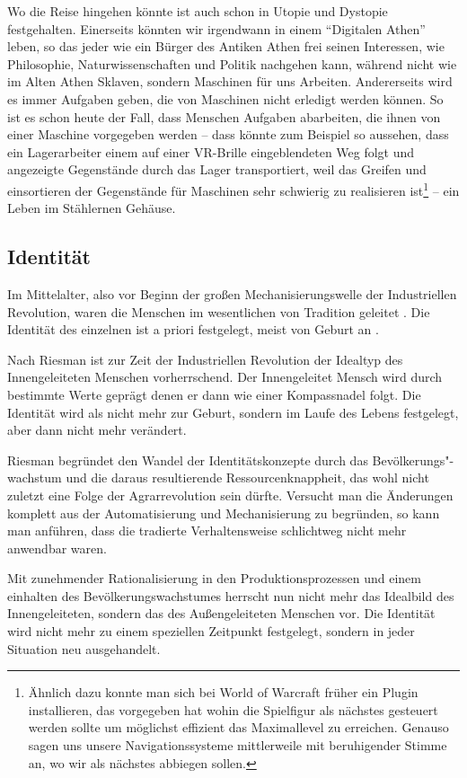 Wo die Reise hingehen könnte ist auch schon in Utopie und Dystopie festgehalten.
Einerseits könnten wir irgendwann in einem \enquote{Digitalen Athen} leben, so das jeder wie ein Bürger des Antiken Athen frei seinen Interessen, wie Philosophie, Naturwissenschaften und Politik nachgehen kann, während nicht wie im Alten Athen Sklaven, sondern Maschinen für uns Arbeiten.
Andererseits wird es immer Aufgaben geben, die von Maschinen nicht erledigt werden können.
So ist es schon heute der Fall, dass Menschen Aufgaben abarbeiten, die ihnen von einer Maschine vorgegeben werden – dass könnte zum Beispiel so aussehen, dass ein Lagerarbeiter einem auf einer VR-Brille eingeblendeten Weg folgt und angezeigte Gegenstände durch das Lager transportiert, weil das Greifen und einsortieren der Gegenstände für Maschinen sehr schwierig zu realisieren ist\footnote{Ähnlich dazu konnte man sich bei World of Warcraft früher ein Plugin installieren, das vorgegeben hat wohin die Spielfigur als nächstes gesteuert werden sollte um möglichst effizient das Maximallevel zu erreichen. Genauso sagen uns unsere Navigationssysteme mittlerweile mit beruhigender Stimme an, wo wir als nächstes abbiegen sollen.} – ein Leben im Stählernen Gehäuse.

\subsection{Identität}

Im Mittelalter, also vor Beginn der großen Mechanisierungswelle der Industriellen Revolution, waren die Menschen im wesentlichen von Tradition geleitet \parencite{riessman}.
Die Identität des einzelnen ist a priori festgelegt, meist von Geburt an \parencite{rosa}.

Nach Riesman ist zur Zeit der Industriellen Revolution der Idealtyp des Innengeleiteten Menschen vorherrschend. Der Innengeleitet Mensch wird durch bestimmte Werte geprägt denen er dann wie einer Kompassnadel folgt.
Die Identität wird als nicht mehr zur Geburt, sondern im Laufe des Lebens festgelegt, aber dann nicht mehr verändert.

Riesman begründet den Wandel der Identitätskonzepte durch das Bevölkerungs"-wachstum und die daraus resultierende Ressourcenknappheit, das wohl nicht zuletzt eine Folge der Agrarrevolution sein dürfte.
Versucht man die Änderungen komplett aus der Automatisierung und Mechanisierung zu begründen, so kann man anführen, dass die tradierte Verhaltensweise schlichtweg nicht mehr anwendbar waren. 

Mit zunehmender Rationalisierung in den Produktionsprozessen und einem einhalten des Bevölkerungswachstumes herrscht nun nicht mehr das Idealbild des Innengeleiteten, sondern das des Außengeleiteten Menschen vor.
Die Identität wird nicht mehr zu einem speziellen Zeitpunkt festgelegt, sondern in jeder Situation neu ausgehandelt.
